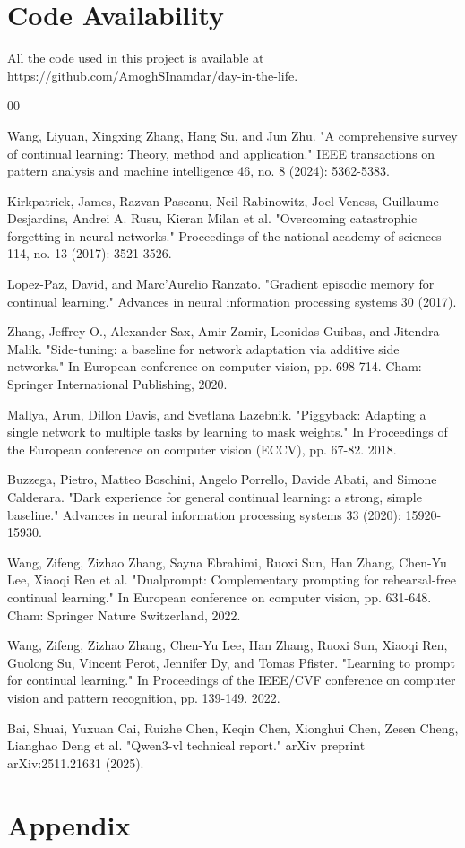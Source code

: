 \documentclass{article}
\begin{document}
\section*{Code Availability}
All the code used in this project is available at \url{https://github.com/AmoghSInamdar/day-in-the-life}.

\begin{thebibliography}{00}

		Wang, Liyuan, Xingxing Zhang, Hang Su, and Jun Zhu. "A comprehensive survey of continual learning: Theory,
		method and application." IEEE transactions on pattern analysis and machine intelligence 46, no. 8 (2024): 5362-5383.

		Kirkpatrick, James, Razvan Pascanu, Neil Rabinowitz, Joel Veness, Guillaume Desjardins, Andrei A. Rusu,
		Kieran Milan et al. "Overcoming catastrophic forgetting in neural networks." Proceedings of the national
		academy of sciences 114, no. 13 (2017): 3521-3526.

		Lopez-Paz, David, and Marc'Aurelio Ranzato. "Gradient episodic memory for continual learning." Advances in
		neural information processing systems 30 (2017).

		Zhang, Jeffrey O., Alexander Sax, Amir Zamir, Leonidas Guibas, and Jitendra Malik. "Side-tuning: a baseline
		for network adaptation via additive side networks." In European conference on computer vision, pp. 698-714.
		Cham: Springer International Publishing, 2020.

		Mallya, Arun, Dillon Davis, and Svetlana Lazebnik. "Piggyback: Adapting a single network to multiple tasks
		by learning to mask weights." In Proceedings of the European conference on computer vision (ECCV), pp. 67-82. 2018.

		Buzzega, Pietro, Matteo Boschini, Angelo Porrello, Davide Abati, and Simone Calderara. "Dark experience for
		general continual learning: a strong, simple baseline." Advances in neural information processing systems
		33 (2020): 15920-15930.

		Wang, Zifeng, Zizhao Zhang, Sayna Ebrahimi, Ruoxi Sun, Han Zhang, Chen-Yu Lee, Xiaoqi Ren et al.
		"Dualprompt: Complementary prompting for rehearsal-free continual learning." In European conference on
		computer vision, pp. 631-648. Cham: Springer Nature Switzerland, 2022.

		Wang, Zifeng, Zizhao Zhang, Chen-Yu Lee, Han Zhang, Ruoxi Sun, Xiaoqi Ren, Guolong Su, Vincent Perot,
		Jennifer Dy, and Tomas Pfister. "Learning to prompt for continual learning." In Proceedings of the IEEE/CVF
		conference on computer vision and pattern recognition, pp. 139-149. 2022.

		Bai, Shuai, Yuxuan Cai, Ruizhe Chen, Keqin Chen, Xionghui Chen, Zesen Cheng, Lianghao Deng et al. "Qwen3-vl
		technical report." arXiv preprint arXiv:2511.21631 (2025).

\end{thebibliography}

\raggedbottom

\section*{Appendix}

\raggedbottom
\end{document}
